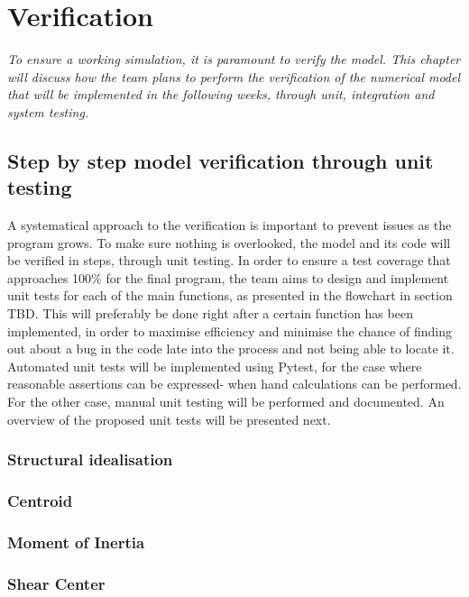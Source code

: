 \section{Verification}
\label{sec:verification}
\textit{To ensure a working simulation, it is paramount to verify the model. This chapter will discuss how the team plans to perform the verification of the numerical model that will be implemented in the following weeks, through unit, integration and system testing.}

\subsection{Step by step model verification through unit testing}
A systematical approach to the verification is important to prevent issues as the program grows. To make sure nothing is overlooked, the model and its code will be verified in steps, through unit testing. In order to ensure a test coverage that approaches 100\% for the final program, the team aims to design and implement unit tests for each of the main functions, as presented in the flowchart in section TBD. This will preferably be done right after a certain function has been implemented, in order to maximise efficiency and minimise the chance of finding out about a bug in the code late into the process and not being able to locate it. Automated unit tests will be implemented using Pytest, for the case where reasonable assertions can be expressed- when hand calculations can be performed. For the other case, manual unit testing will be performed and documented. An overview of the proposed unit tests will be presented next. 

\subsubsection{Structural idealisation}
\subsubsection{Centroid}
\subsubsection{Moment of Inertia}
\subsubsection{Shear Center}
